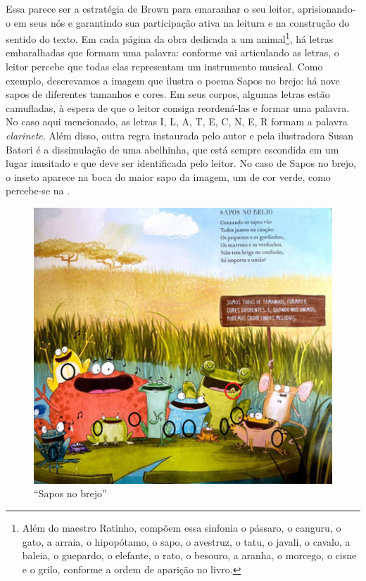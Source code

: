\documentclass[portuguese]{textolivre}
\begin{document}
Essa parece ser a estratégia de Brown para emaranhar o seu leitor,
aprisionando-o em seus nós e garantindo sua participação ativa na leitura e na
construção do sentido do texto. Em cada página da obra dedicada a um
animal\footnote{Além do maestro Ratinho, compõem essa sinfonia o pássaro, o
canguru, o gato, a arraia, o hipopótamo, o sapo, o avestruz, o tatu, o javali,
o cavalo, a baleia, o guepardo, o elefante, o rato, o besouro, a aranha, o
morcego, o cisne e o grilo, conforme a ordem de aparição no livro.}, há letras
embaralhadas que formam uma palavra: conforme vai articulando as letras, o
leitor percebe que todas elas representam um instrumento musical. Como exemplo,
descrevamos a imagem que ilustra o poema Sapos no brejo: há nove sapos de
diferentes tamanhos e cores. Em seus corpos, algumas letras estão camufladas, à
espera de que o leitor consiga reordená-las e formar uma palavra. No caso aqui
mencionado, as letras I, L, A, T, E, C, N, E, R formam a palavra
\textit{clarinete}. Além disso, outra regra instaurada pelo autor e pela
ilustradora Susan Batori é a dissimulação de uma abelhinha, que está sempre
escondida em um lugar inusitado e que deve ser identificada pelo leitor. No
caso de Sapos no brejo, o inseto aparece na boca do maior sapo da imagem, um de
cor verde, como percebe-se na .

\begin{figure}[htbp]
    \centering
    \includegraphics[width=0.85\linewidth]{Fig3.jpeg}
    \caption{“Sapos no brejo”}
    \label{fig3}
\end{figure}
\end{document}
